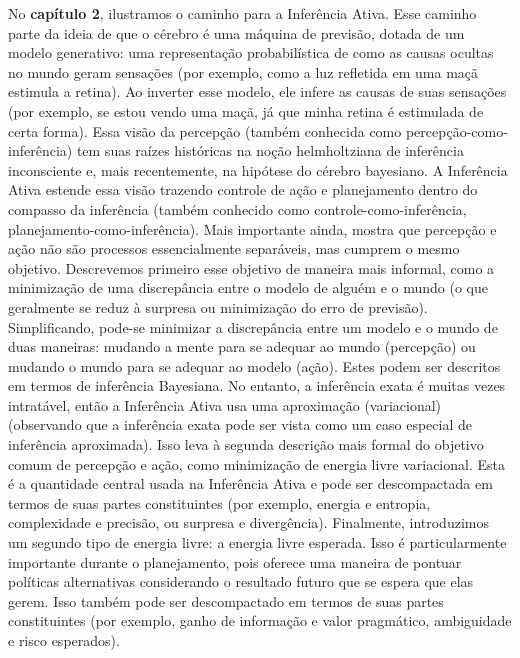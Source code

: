 \documentclass[
  12pt,
]{book}
\begin{document}
No \textbf{capítulo 2}, ilustramos o caminho para a Inferência Ativa. Esse caminho parte da ideia de que o cérebro é uma máquina de previsão, dotada de um modelo generativo: uma representação probabilística de como as causas ocultas no mundo geram sensações (por exemplo, como a luz refletida em uma maçã estimula a retina). Ao inverter esse modelo, ele infere as causas de suas sensações (por exemplo, se estou vendo uma maçã, já que minha retina é estimulada de certa forma). Essa visão da percepção (também conhecida como percepção-como-inferência) tem suas raízes históricas na noção helmholtziana de inferência inconsciente e, mais recentemente, na hipótese do cérebro bayesiano. A Inferência Ativa estende essa visão trazendo controle de ação e planejamento dentro do compasso da inferência (também conhecido como controle-como-inferência, planejamento-como-inferência). Mais importante ainda, mostra que percepção e ação não são processos essencialmente separáveis, mas cumprem o mesmo objetivo. Descrevemos primeiro esse objetivo de maneira mais informal, como a minimização de uma discrepância entre o modelo de alguém e o mundo (o que geralmente se reduz à surpresa ou minimização do erro de previsão). Simplificando, pode-se minimizar a discrepância entre um modelo e o mundo de duas maneiras: mudando a mente para se adequar ao mundo (percepção) ou mudando o mundo para se adequar ao modelo (ação). Estes podem ser descritos em termos de inferência Bayesiana. No entanto, a inferência exata é muitas vezes intratável, então a Inferência Ativa usa uma aproximação (variacional) (observando que a inferência exata pode ser vista como um caso especial de inferência aproximada). Isso leva à segunda descrição mais formal do objetivo comum de percepção e ação, como minimização de energia livre variacional. Esta é a quantidade central usada na Inferência Ativa e pode ser descompactada em termos de suas partes constituintes (por exemplo, energia e entropia, complexidade e precisão, ou surpresa e divergência). Finalmente, introduzimos um segundo tipo de energia livre: a energia livre esperada. Isso é particularmente importante durante o planejamento, pois oferece uma maneira de pontuar políticas alternativas considerando o resultado futuro que se espera que elas gerem. Isso também pode ser descompactado em termos de suas partes constituintes (por exemplo, ganho de informação e valor pragmático, ambiguidade e risco esperados).
\end{document}
